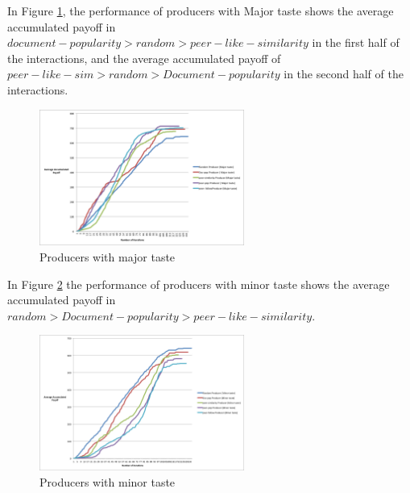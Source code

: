 \documentclass [12pt]{article} \usepackage{multicol}
\begin{document}
In Figure \ref{fig:images/F11}, the performance of producers with Major taste shows the average accumulated payoff in $ document-popularity > random > peer-like-similarity$
in the first half of the interactions, and the average accumulated payoff of $ peer-like-sim > random > Document-popularity$ in
the second half of the interactions.  


\begin{figure}[h!]
\begin{center}
\includegraphics[width=0.6\textwidth,center]{images/EXP8-Strategies_Prod-Major-taste}
\caption{Producers with major taste}
\label{fig:images/F11}
\end{center}
\end{figure}

In  Figure \ref{fig:images/F12} the performance of producers with minor taste shows the average accumulated payoff in $  random > Document-popularity > peer-like-similarity$.  


\begin{figure}[h!]
\begin{center}
\includegraphics[width=0.6\textwidth,center]{images/EXP8-Strategies_Prod-Minor-taste}
\caption{Producers with minor taste}
\label{fig:images/F12}
\end{center}
\end{figure}
\end{document}

